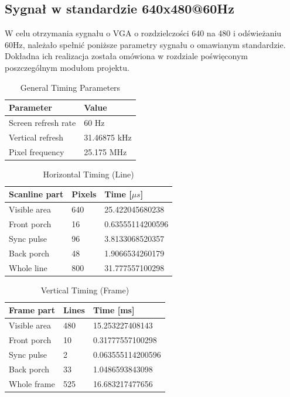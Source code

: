 \documentclass[12pt, a4paper]{article}
\begin{document}
\subsection{Sygnał w standardzie 640x480@60Hz}
W celu otrzymania sygnału o VGA o rozdzielczości 640 na 480 i odświeżaniu 60Hz, należało spełnić poniższe parametry sygnału o omawianym standardzie.
Dokładna ich realizacja została omówiona w rozdziale poświęconym poszczególnym modułom projektu.
\begin{table}[H]
    \centering
    \caption{General Timing Parameters}
    \begin{tabular}{|l|l|}
    \hline
    \textbf{Parameter} & \textbf{Value} \\ 
    \hline
    Screen refresh rate & 60 Hz \\
    Vertical refresh & 31.46875 kHz \\
    Pixel frequency & 25.175 MHz \\
    \hline
    \end{tabular}
\end{table}

\begin{table}[H]
    \centering
    \caption{Horizontal Timing (Line)}
    \begin{tabular}{|l|l|l|}
    \hline
    \textbf{Scanline part} & \textbf{Pixels} & \textbf{Time [$\mu s$]} \\ 
    \hline
    Visible area & 640 & 25.422045680238 \\
    Front porch & 16 & 0.63555114200596 \\
    Sync pulse & 96 & 3.8133068520357 \\
    Back porch & 48 & 1.9066534260179 \\
    Whole line & 800 & 31.777557100298 \\
    \hline
    \end{tabular}
\end{table}

\begin{table}[H]
    \centering
    \caption{Vertical Timing (Frame)}
    \begin{tabular}{|l|l|l|}
    \hline
    \textbf{Frame part} & \textbf{Lines} & \textbf{Time [ms]} \\ 
    \hline
    Visible area & 480 & 15.253227408143 \\
    Front porch & 10 & 0.31777557100298 \\
    Sync pulse & 2 & 0.063555114200596 \\
    Back porch & 33 & 1.0486593843098 \\
    Whole frame & 525 & 16.683217477656 \\
    \hline
    \end{tabular}
\end{table}
\end{document}
